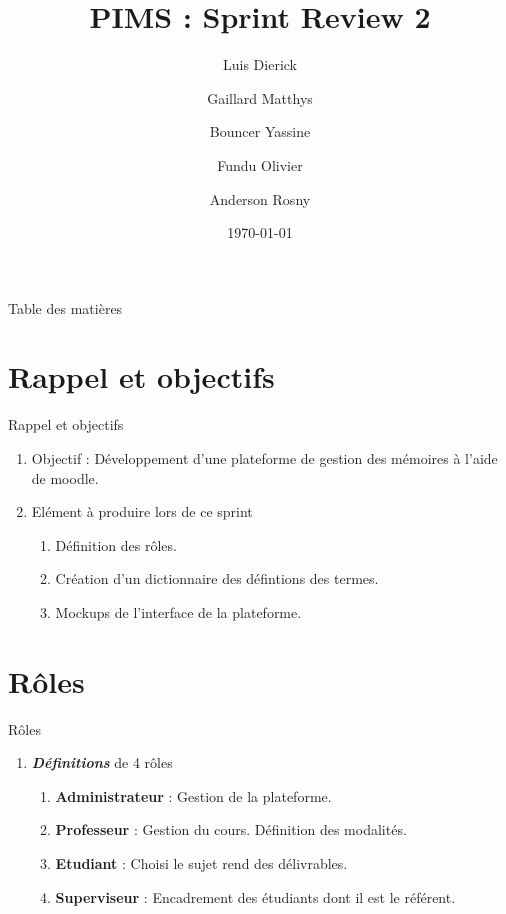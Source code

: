 \documentclass[numbering=fraction]{beamer}
\title{PIMS : Sprint Review 2}
\author[PIMS]{Luis Dierick \and Gaillard Matthys \and Bouncer Yassine \and Fundu Olivier \and Anderson Rosny }
\institute{Université de Namur}
\date{\today}
\begin{document}
\begin{frame}[plain]{}
    \maketitle
\end{frame}

\begin{frame}{Table des matières}
    \tableofcontents
\end{frame}
\section{Rappel et objectifs}
\begin{frame}{Rappel et objectifs}
    \begin{enumerate}
        \item Objectif : Développement d'une plateforme de gestion des mémoires à l'aide de moodle.
        \item Elément à produire lors de ce sprint
        \begin{enumerate}
            \item Définition des rôles.
            \item Création d'un dictionnaire des défintions des termes.
            \item Mockups de l'interface de la plateforme.
        \end{enumerate}
    \end{enumerate}
\end{frame}
\section{Rôles}
\begin{frame}{Rôles}
    \begin{enumerate}
        \item \textbf{\textit{Définitions}} de 4 rôles
        \begin{enumerate}
            \item \textbf{Administrateur} : Gestion de la plateforme.
            \item \textbf{Professeur} : Gestion du cours. Définition des modalités.
            \item \textbf{Etudiant} : Choisi le sujet rend des délivrables.
            \item \textbf{Superviseur} : Encadrement des étudiants dont il est le référent.
        \end{enumerate}
    \end{enumerate}
\end{frame}
\end{document}
